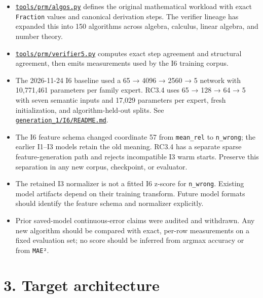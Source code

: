 \documentclass[
  10pt,
]{article}
\providecommand{\tightlist}{%
  \setlength{\itemsep}{0pt}\setlength{\parskip}{0pt}}
\begin{document}
\begin{itemize}
\tightlist
\item
  \href{../tools/prm/algos.py}{\texttt{tools/prm/algos.py}} defines the
  original mathematical workload with exact \texttt{Fraction} values and
  canonical derivation steps. The verifier lineage has expanded this
  into 150 algorithms across algebra, calculus, linear algebra, and
  number theory.
\item
  \href{../tools/prm/verifier5.py}{\texttt{tools/prm/verifier5.py}}
  computes exact step agreement and structural agreement, then emits
  measurements used by the I6 training corpus.
\item
  The 2026-11-24 I6 baseline used a 65 → 4096 → 2560 → 5 network with
  10,771,461 parameters per family expert. RC3.4 uses 65 → 128 → 64 → 5
  with seven semantic inputs and 17,029 parameters per expert, fresh
  initialization, and algorithm-held-out splits. See
  \href{../generation_1/I6/README.md}{\texttt{generation\_1/I6/README.md}}.
\item
  The I6 feature schema changed coordinate 57 from \texttt{mean\_rel} to
  \texttt{n\_wrong}; the earlier I1--I3 models retain the old meaning.
  RC3.4 has a separate sparse feature-generation path
  and rejects incompatible I3 warm starts. Preserve this separation in
  any new corpus, checkpoint, or evaluator.
\item
  The retained I3 normalizer is not a fitted I6 z-score for
  \texttt{n\_wrong}. Existing model artifacts depend on their training
  transform. Future model formats should identify the feature schema and
  normalizer explicitly.
\item
  Prior saved-model continuous-error claims were audited and withdrawn.
  Any new algorithm should be compared with exact, per-row measurements
  on a fixed evaluation set; no score should be inferred from argmax
  accuracy or from \texttt{MAE²}.
\end{itemize}

\section{3. Target architecture}\label{target-architecture}
\end{document}
